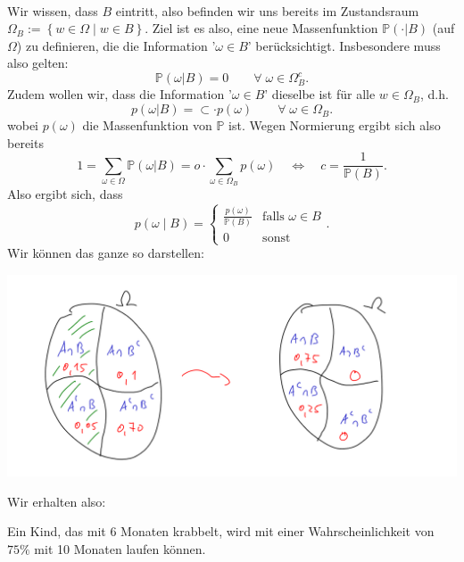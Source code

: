 \begin{example}
\begin{minipage}{\textwidth}
\begin{minipage}{0.5\textwidth}
        \end{minipage}
    \end{minipage}
    \\
    Wir wissen, dass $B$ eintritt, also befinden wir uns bereits im Zustandsraum  $\Omega_B := \left \{w\in \Omega \mid  w\in B\right\} $. Ziel ist es also, eine neue Massenfunktion $\mathbb{P}(\cdot |B)$ (auf $\Omega$) zu definieren, die die Information '$\omega\in B$' berücksichtigt. Insbesondere muss also gelten:
    \[
        \mathbb{P}(\omega | B) = 0 \qquad \forall\; \omega\in \Omega_B^{c}
    .\] 
    Zudem wollen wir, dass die Information '$\omega \in B$' dieselbe ist für alle $w\in \Omega_B$, d.h.
    \[
        p(\omega|B) = \subset \cdot p(\omega) \qquad \forall \; \omega\in \Omega_B
    .\] 
    wobei $p(\omega)$ die Massenfunktion von $\mathbb{P}$ ist. Wegen Normierung ergibt sich also bereits
    \[
        1 = \sum_{\omega\in \Omega} \mathbb{P}(\omega|B) = o\cdot \sum_{\omega\in \Omega_B} p(\omega) \quad \iff  \quad c = \frac{1}{\mathbb{P}(B)}
    .\] 
    Also ergibt sich, dass 
    \[
        p(\omega\mid B) = \begin{cases}
            \frac{p(\omega)}{\mathbb{P}(B)} & \text{falls } \omega\in B \\
            0 & \text{sonst}
        \end{cases}
    .\] 
    Wir können das ganze so darstellen: \\
    \begin{minipage}[t]{\textwidth}
        \centering
        \vspace{-2ex}
    \includegraphics[scale=0.2]{figures/Bedingte Wahrscheinlichkeit II.png}
    \vspace{2ex}
    \end{minipage}
    Wir erhalten also:
    \begin{answer}
        Ein Kind, das mit 6 Monaten krabbelt, wird mit einer Wahrscheinlichkeit von $75\%$ mit 10 Monaten laufen können.
    \end{answer}
\end{example}
